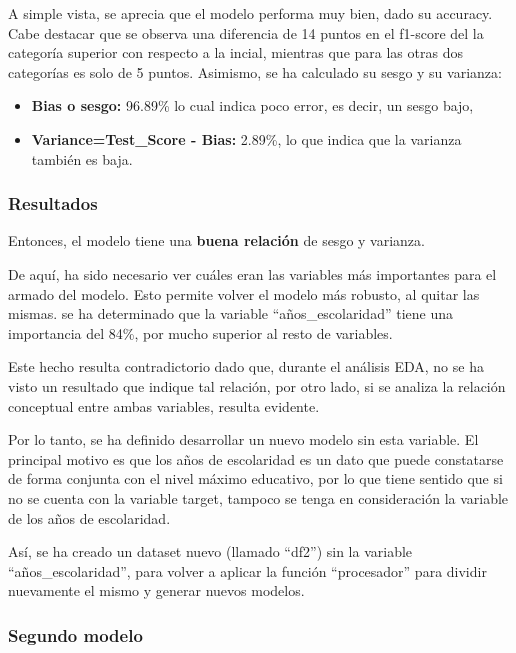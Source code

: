 \documentclass[a4paper]{article}
\begin{document}
            A simple vista, se aprecia que el modelo performa muy bien, dado su accuracy. Cabe destacar que se observa una diferencia de 14 puntos en el f1-score del la categoría superior con respecto a la incial, mientras que para las otras dos categorías es solo de 5 puntos. Asimismo, se ha calculado su sesgo y su varianza:
            \begin{itemize}
                \item \textbf{Bias o sesgo:} 96.89\% lo cual indica poco error, es decir, un sesgo bajo,
                \item \textbf{Variance=Test\_Score - Bias:} 2.89\%, lo que indica que la varianza también es baja.
            \end{itemize}


            \subsubsection*{Resultados}

            Entonces, el modelo tiene una \textbf{buena relación} de sesgo y varianza.

            De aquí, ha sido necesario ver cuáles eran las variables más importantes para el armado del modelo. Esto permite volver el modelo más robusto, al quitar las mismas. se ha determinado que la variable ``años\_escolaridad'' tiene una importancia del 84\%, por mucho superior al resto de variables.

            Este hecho resulta contradictorio dado que, durante el análisis EDA, no se ha visto un resultado que indique tal relación, por otro lado, si se analiza la relación conceptual entre ambas variables, resulta evidente.

            Por lo tanto, se ha definido desarrollar un nuevo modelo sin esta variable. El principal motivo es que los años de escolaridad es un dato que puede constatarse de forma conjunta con el nivel máximo educativo, por lo que tiene sentido que si no se cuenta con la variable target, tampoco se tenga en consideración la variable de los años de escolaridad.

            Así, se ha creado un dataset nuevo (llamado ``df2'') sin la variable ``años\_escolaridad'', para volver a aplicar la función ``procesador'' para dividir nuevamente el mismo y generar nuevos modelos.

        \subsubsection{Segundo modelo}
\end{document}
